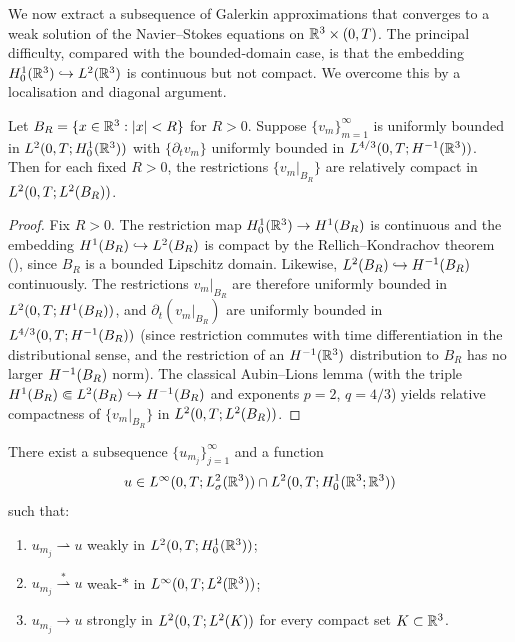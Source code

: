 We now extract a subsequence of Galerkin approximations that converges to a
weak solution of the Navier--Stokes equations on $\mathbb{R}^{3} \times (0, T)$.  The
principal difficulty, compared with the bounded-domain case, is that the
embedding $H^{1}_0(\mathbb{R}^{3}) \hookrightarrow L^{2}(\mathbb{R}^{3})$ is continuous but not
compact.  We overcome this by a localisation and diagonal argument.

\begin{theorem}\label{thm:aubin-lions}
  Let $B_{R} = \{x \in \mathbb{R}^{3} : \left\lvert x \right\rvert < R\}$ for $R > 0$.  Suppose
  $\{v_{m}\}_{m=1}^{\infty}$ is uniformly bounded in
  $L^{2}(0, T; H^{1}_0(\mathbb{R}^{3}))$ with $\{\partial_{t} v_{m}\}$ uniformly bounded in
  $L^{4/3}(0, T; H^{-1}(\mathbb{R}^{3}))$.  Then for each fixed $R > 0$, the restrictions
  $\{v_{m}|_{B_{R}}\}$ are relatively compact in $L^{2}(0, T; L^{2}(B_{R}))$.
\end{theorem}

\begin{proof}
  Fix $R > 0$.  The restriction map $H^{1}_0(\mathbb{R}^{3}) \to H^{1}(B_{R})$ is
  continuous and the embedding $H^{1}(B_{R}) \hookrightarrow L^{2}(B_{R})$ is
  compact by the Rellich--Kondrachov theorem (), since
  $B_{R}$ is a bounded Lipschitz domain.  Likewise,
  $L^{2}(B_{R}) \hookrightarrow H^{-1}(B_{R})$ continuously.  The restrictions
  $v_{m}|_{B_{R}}$ are therefore uniformly bounded in
  $L^{2}(0, T; H^{1}(B_{R}))$, and $\partial_{t}(v_{m}|_{B_{R}})$ are uniformly
  bounded in $L^{4/3}(0, T; H^{-1}(B_{R}))$ (since restriction commutes with
  time differentiation in the distributional sense, and the restriction of an
  $H^{-1}(\mathbb{R}^{3})$ distribution to $B_{R}$ has no larger $H^{-1}(B_{R})$ norm).
  The classical Aubin--Lions lemma (with the triple
  $H^{1}(B_{R}) \Subset L^{2}(B_{R}) \hookrightarrow H^{-1}(B_{R})$
  and exponents $p = 2$, $q = 4/3$) yields relative
  compactness of $\{v_{m}|_{B_{R}}\}$ in $L^{2}(0, T; L^{2}(B_{R}))$.
\end{proof}

\begin{theorem}\label{thm:galerkin-convergence}
  There exist a subsequence $\{u_{m_{j}}\}_{j=1}^{\infty}$ and a function
  \[
    u \in L^{\infty}(0, T; L^{2}_\sigma(\mathbb{R}^{3}))
    \cap L^{2}(0, T; H^{1}_0(\mathbb{R}^{3}; \mathbb{R}^{3}))
  \]
  such that:
  \begin{enumerate}[label=(\roman*)]
    \item $u_{m_{j}} \rightharpoonup u$ weakly in
          $L^{2}(0, T; H^{1}_0(\mathbb{R}^{3}))$;
    \item $u_{m_{j}} \overset{*}{\rightharpoonup} u$ weak-$*$ in
          $L^{\infty}(0, T; L^{2}(\mathbb{R}^{3}))$;
    \item $u_{m_{j}} \to u$ strongly in
          $L^{2}(0, T; L^{2}(K))$ for every compact set $K \subset \mathbb{R}^{3}$.
  \end{enumerate}
\end{theorem}

